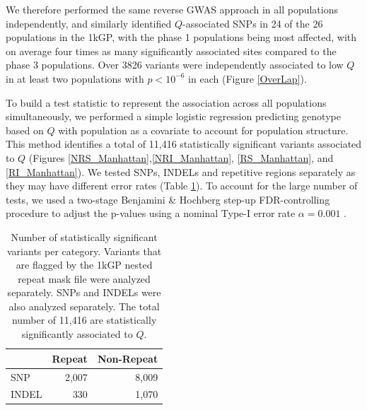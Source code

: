 \documentclass[9pt,lineno]{elife}
\begin{document}
We therefore performed the same reverse GWAS approach in all populations independently, and similarly identified $Q$-associated SNPs in 24 of the 26 populations in the 1kGP, with the phase 1 populations being most affected, with on average four times as many significantly associated sites compared to the phase 3 populations.
Over 3826 variants were independently associated to low $Q$ in at least two populations with $ p < 10^{-6}$ in each (Figure \ref{OverLap}).

To build a test statistic to represent the association across all populations simultaneously, we performed a simple logistic regression predicting genotype based on $Q$ with population as a covariate to account for population structure.
This method identifies a total of 11,416 statistically significant variants associated to $Q$ (Figures \ref{NRS_Manhattan},\ref{NRI_Manhattan}, \ref{RS_Manhattan}, and \ref{RI_Manhattan}). 
We tested SNPs, INDELs and repetitive regions separately as they may have different error rates (Table \ref{sigTable}).
To account for the large number of tests, we used a two-stage Benjamini \& Hochberg step-up FDR-controlling procedure to adjust the p-values using a nominal Type-I error rate $\alpha = 0.001$ \citep{Benjamini2006}. 

\begin{table}[h]
\centering
\begin{tabular}{l  r r}
                      & {Repeat}  & {Non-Repeat}       \\ \hline
{SNP}  & 2,007 & 8,009 \\  
{INDEL} & 330 & 1,070 \\ \hline
\end{tabular}
\caption{Number of statistically significant variants per category. Variants that are flagged by the 1kGP nested repeat mask file were analyzed separately. SNPs and INDELs were also analyzed separately. The total number of 11,416 are statistically significantly associated to $Q$.}
\label{sigTable}
\end{table}
\end{document}
